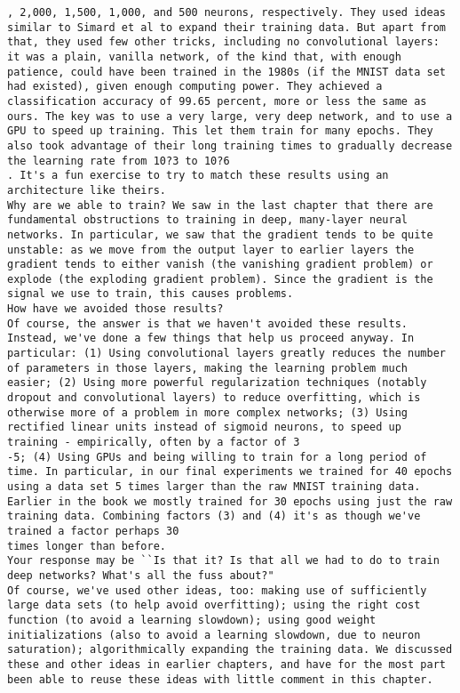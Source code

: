 \begin{lstlisting}
, 2,000, 1,500, 1,000, and 500 neurons, respectively. They used ideas similar to Simard et al to expand their training data. But apart from that, they used few other tricks, including no convolutional layers: it was a plain, vanilla network, of the kind that, with enough patience, could have been trained in the 1980s (if the MNIST data set had existed), given enough computing power. They achieved a classification accuracy of 99.65 percent, more or less the same as ours. The key was to use a very large, very deep network, and to use a GPU to speed up training. This let them train for many epochs. They also took advantage of their long training times to gradually decrease the learning rate from 10?3 to 10?6
. It's a fun exercise to try to match these results using an architecture like theirs.
Why are we able to train? We saw in the last chapter that there are fundamental obstructions to training in deep, many-layer neural networks. In particular, we saw that the gradient tends to be quite unstable: as we move from the output layer to earlier layers the gradient tends to either vanish (the vanishing gradient problem) or explode (the exploding gradient problem). Since the gradient is the signal we use to train, this causes problems.
How have we avoided those results? 
Of course, the answer is that we haven't avoided these results. Instead, we've done a few things that help us proceed anyway. In particular: (1) Using convolutional layers greatly reduces the number of parameters in those layers, making the learning problem much easier; (2) Using more powerful regularization techniques (notably dropout and convolutional layers) to reduce overfitting, which is otherwise more of a problem in more complex networks; (3) Using rectified linear units instead of sigmoid neurons, to speed up training - empirically, often by a factor of 3
-5; (4) Using GPUs and being willing to train for a long period of time. In particular, in our final experiments we trained for 40 epochs using a data set 5 times larger than the raw MNIST training data. Earlier in the book we mostly trained for 30 epochs using just the raw training data. Combining factors (3) and (4) it's as though we've trained a factor perhaps 30
times longer than before.
Your response may be ``Is that it? Is that all we had to do to train deep networks? What's all the fuss about?"
Of course, we've used other ideas, too: making use of sufficiently large data sets (to help avoid overfitting); using the right cost function (to avoid a learning slowdown); using good weight initializations (also to avoid a learning slowdown, due to neuron saturation); algorithmically expanding the training data. We discussed these and other ideas in earlier chapters, and have for the most part been able to reuse these ideas with little comment in this chapter.

\end{lstlisting}
